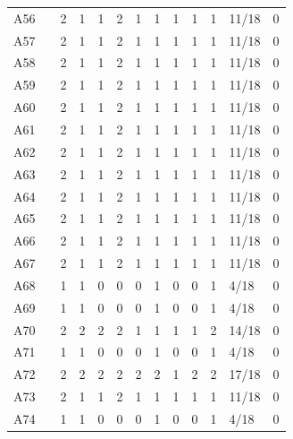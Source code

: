 {\begin{longtable}{p{0.55cm}p{0.9cm}rrrrrrrrrp{1.1cm}p{1.0cm}}
A56 & \cite{Kumar2025} & 2 & 1 & 1 & 2 & 1 & 1 & 1 & 1 & 1 & 11/18 & 0 \\
A57 & \cite{Aqeel2025} & 2 & 1 & 1 & 2 & 1 & 1 & 1 & 1 & 1 & 11/18 & 0 \\
A58 & \cite{Selvi2025} & 2 & 1 & 1 & 2 & 1 & 1 & 1 & 1 & 1 & 11/18 & 0 \\
A59 & \cite{AR2025} & 2 & 1 & 1 & 2 & 1 & 1 & 1 & 1 & 1 & 11/18 & 0 \\
A60 & \cite{Leduc2025} & 2 & 1 & 1 & 2 & 1 & 1 & 1 & 1 & 1 & 11/18 & 0 \\
A61 & \cite{Jamshidi2025} & 2 & 1 & 1 & 2 & 1 & 1 & 1 & 1 & 1 & 11/18 & 0 \\
A62 & \cite{10.1145/3759179.3760358} & 2 & 1 & 1 & 2 & 1 & 1 & 1 & 1 & 1 & 11/18 & 0 \\
A63 & \cite{Nsour2025_QRSecOC} & 2 & 1 & 1 & 2 & 1 & 1 & 1 & 1 & 1 & 11/18 & 0 \\
A64 & \cite{RASHEED2025100933} & 2 & 1 & 1 & 2 & 1 & 1 & 1 & 1 & 1 & 11/18 & 0 \\
A65 & \cite{11104087} & 2 & 1 & 1 & 2 & 1 & 1 & 1 & 1 & 1 & 11/18 & 0 \\
A66 & \cite{ISLAM2025101653} & 2 & 1 & 1 & 2 & 1 & 1 & 1 & 1 & 1 & 11/18 & 0 \\
A67 & \cite{ARSHAD2025110487} & 2 & 1 & 1 & 2 & 1 & 1 & 1 & 1 & 1 & 11/18 & 0 \\
A68 & \cite{Li2025_SSRN5325474} & 1 & 1 & 0 & 0 & 0 & 1 & 0 & 0 & 1 & 4/18 & 0 \\
A69 & \cite{Karthik_Kumar_Vaigandla_2025} & 1 & 1 & 0 & 0 & 0 & 1 & 0 & 0 & 1 & 4/18 & 0 \\
A70 & \cite{Hayouni2025} & 2 & 2 & 2 & 2 & 1 & 1 & 1 & 1 & 2 & 14/18 & 0 \\
A71 & \cite{Gunawardhana2025} & 1 & 1 & 0 & 0 & 0 & 1 & 0 & 0 & 1 & 4/18 & 0 \\
A72 & \cite{Stadler_2025} & 2 & 2 & 2 & 2 & 2 & 2 & 1 & 2 & 2 & 17/18 & 0 \\
A73 & \cite{SHU2026111974} & 2 & 1 & 1 & 2 & 1 & 1 & 1 & 1 & 1 & 11/18 & 0 \\
A74 & \cite{Gencoglu2026} & 1 & 1 & 0 & 0 & 0 & 1 & 0 & 0 & 1 & 4/18 & 0 \\
\end{longtable}
\normalsize
}
